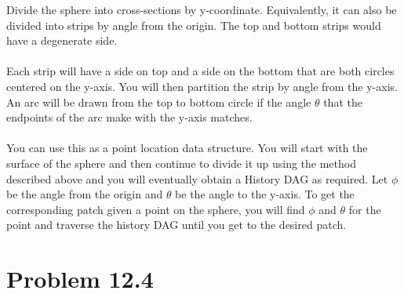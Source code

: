 \documentclass[11pt,psfig]{article}
\begin{document}
Divide the sphere into cross-sections by y-coordinate. Equivalently, it can also be divided into strips by angle from the origin. The top and bottom strips would have a degenerate side. \\
\\
Each strip will have a side on top and a side on the bottom that are both circles centered on the y-axis. You will then partition the strip by angle from the y-axis. An arc will be drawn from the top to bottom circle if the angle $\theta$ that the endpoints of the arc make with the y-axis matches. \\
\\
You can use this as a point location data structure. You will start with the surface of the sphere and then continue to divide it up using the method described above and you will eventually obtain a History DAG as required. Let $\phi$ be the angle from the origin and $\theta$ be the angle to the y-axis. To get the corresponding patch given a point on the sphere, you will find $\phi$ and $\theta$ for the point and traverse the history DAG until you get to the desired patch. \\

\newpage

\section*{Problem 12.4}
\end{document}

